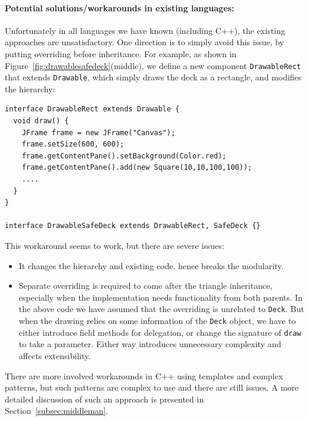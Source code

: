 
\paragraph{Potential solutions/workarounds in existing languages:} Unfortunately in all languages we have known
(including C++), the existing approaches are unsatisfactory.
One direction is to simply avoid this issue, by putting overriding before inheritance. For example, as shown in Figure~\ref{fig:drawablesafedeck}(middle), we define a new component \lstinline|DrawableRect| that extends \lstinline|Drawable|, which simply draws the deck as a rectangle, and modifies the hierarchy:
\vspace{3pt}\begin{lstlisting}
interface DrawableRect extends Drawable {
  void draw() {
    JFrame frame = new JFrame("Canvas");
    frame.setSize(600, 600);
    frame.getContentPane().setBackground(Color.red);
    frame.getContentPane().add(new Square(10,10,100,100));
    ....
  }
}

interface DrawableSafeDeck extends DrawableRect, SafeDeck {}
\end{lstlisting} \vspace{3pt}
This workaround seems to work, but there are severe issues:
\begin{itemize}
	\item It changes the hierarchy and existing code, hence breaks the modularity.
	\item Separate overriding is required to come after the triangle
          inheritance, especially when the implementation needs functionality from both parents. In the above code we have assumed
	that the overriding is unrelated to \lstinline|Deck|. But when the drawing relies on some information of the \lstinline|Deck|
	object, we have to either introduce field methods for delegation, or change the signature of \lstinline|draw| to take a parameter.
	Either way introduces unnecessary complexity and affects extensibility.
\end{itemize}

There are more involved workarounds in C++ using templates and complex
patterns, but such patterns are complex to use and there are still issues. A more detailed discussion of
such an approach is presented in Section~\ref{subsec:middleman}.

